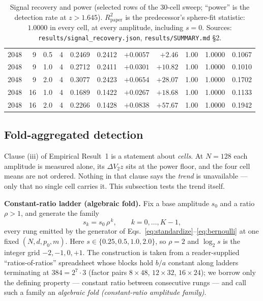 \documentclass[11pt,a4paper]{article}
\theoremstyle{plain}
\theoremstyle{remark}
\theoremstyle{plain}
\begin{document}
\begin{table}[h]
\begin{tabular}{rrrrrrrrrrr}
2048 & 9 & 0.5 & 4 & 0.2469 & 0.2412 & $+0.0057$ & $+2.46$ & 1.00 & 1.0000 & 0.1067 \\
2048 & 9 & 1.0 & 4 & 0.2712 & 0.2411 & $+0.0301$ & $+10.82$ & 1.00 & 1.0000 & 0.1010 \\
2048 & 9 & 2.0 & 4 & 0.3077 & 0.2423 & $+0.0654$ & $\mathbf{+28.07}$ & 1.00 & 1.0000 & 0.1702 \\
2048 & 16 & 1.0 & 4 & 0.1689 & 0.1422 & $+0.0267$ & $+18.68$ & 1.00 & 1.0000 & 0.1133 \\
2048 & 16 & 2.0 & 4 & 0.2266 & 0.1428 & $+0.0838$ & $+57.67$ & 1.00 & 1.0000 & 0.1942 \\
\bottomrule
\end{tabular}
\caption{Signal recovery and power (selected rows of the $30$-cell sweep; ``power'' is the detection rate at $z>1.645$). $R^2_{\text{paper}}$ is the predecessor's sphere-fit statistic: $1.0000$ in every cell, at every amplitude, including $s=0$. Sources: \texttt{results/signal\_recovery.json}, \texttt{results/SUMMARY.md} \S2.}
\label{tab:power}
\end{table}

\subsection{Fold-aggregated detection}
\label{sec:fold}

Clause (iii) of Empirical Result~1 is a statement about \emph{cells}. At $N=128$ each amplitude is measured alone, its $\Delta V_2z$ sits at the power floor, and the four cell means are not ordered. Nothing in that clause says the \emph{trend} is unavailable --- only that no single cell carries it. This subsection tests the trend itself.

\textbf{Constant-ratio ladder (algebraic fold).} Fix a base amplitude $s_0$ and a ratio $\rho>1$, and generate the family
\begin{equation}
s_k=s_0\,\rho^{\,k},\qquad k=0,\dots,K-1,
\label{eq:fold}
\end{equation}
every rung emitted by the generator of Eqs.~\eqref{eq:standardize}--\eqref{eq:bernoulli} at one fixed $(N,d,p_0,m)$. Here $s\in\{0.25,0.5,1.0,2.0\}$, so $\rho=2$ and $\log_2 s$ is the integer grid $-2,-1,0,+1$. The construction is taken from a reader-supplied ``ratios-of-ratios'' spreadsheet whose blocks hold $b/a$ constant along ladders terminating at $384=2^7\cdot3$ (factor pairs $8\times48$, $12\times32$, $16\times24$); we borrow only the defining property --- constant ratio between consecutive rungs --- and call such a family an \emph{algebraic fold (constant-ratio amplitude family)}.
\end{document}
